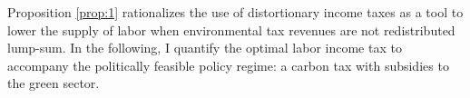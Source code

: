 
Proposition \ref{prop:1} rationalizes the use of distortionary income taxes as a tool to lower the supply of labor when environmental tax revenues are not redistributed lump-sum.
In the following, I quantify the optimal labor income tax to accompany the politically feasible policy regime: a carbon tax with subsidies to the green sector. 

